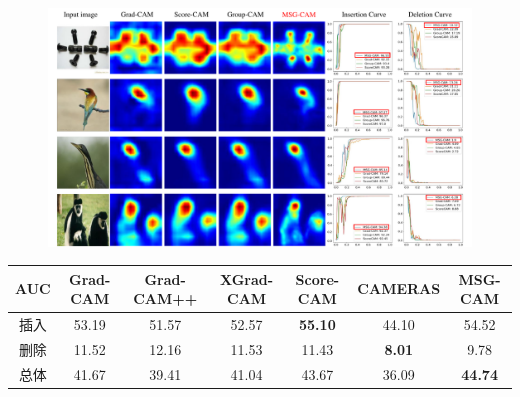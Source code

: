 \begin{figure}[h]
	\centering 
	\includegraphics[width=15cm]{fig/ch3/IDCurve.pdf}
	\label{fig:IDCurve}
\end{figure}


\begin{table}
	\renewcommand{\arraystretch}{1.5}
	\centering
	\wuhao
	\label{auc}

%	
	\begin{tabular}{ccccccc} 
		\toprule[1.5pt]
		AUC & Grad-CAM & Grad-CAM++ & XGrad-CAM & Score-CAM        & CAMERAS       & \textbf{MSG-CAM}  \\ 
		\hline
		插入  & 53.19   & 51.57     & 52.57    & \textbf{55.10}     & 44.10         & 54.52             \\
		删除  & 11.52   & 12.16     & 11.53    & 11.43              & \textbf{8.01} & 9.78              \\
		总体  & 41.67   & 39.41     & 41.04    & 43.67              & 36.09         & \textbf{44.74}    \\
		\bottomrule[1.5pt]
	\end{tabular}
\end{table}

